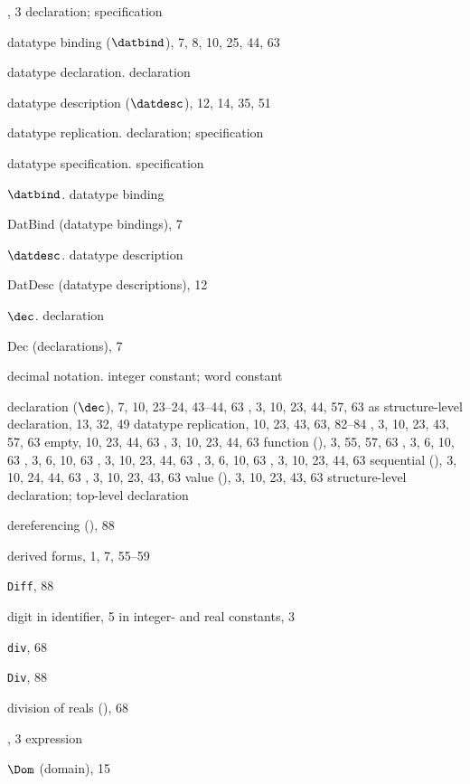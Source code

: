 \begin{theindex}
\item \DATATYPE, 3
\subitem \seealso declaration; specification
\item datatype binding ($\datbind$), 7, 8, 10, 25, 44, 63
\item datatype declaration. \see declaration
\item datatype description ($\datdesc$), 12, 14, 35, 51
\item datatype replication. \see declaration; specification
\item datatype specification. \see specification
\item $\datbind$. \see datatype binding
\item DatBind (datatype bindings), 7
\item $\datdesc$. \see datatype description
\item DatDesc (datatype descriptions), 12
\item $\dec$. \see declaration
\item Dec (declarations), 7
\item decimal notation. \see integer constant; word constant
\item declaration ($\dec$), 7, 10, 23--24, 43--44, 63
\subitem {}, 3, 10, 23, 44, 57, 63
\subitem as structure-level declaration, 13, 32, 49
\subitem datatype replication, 10, 23, 43, 63, 82--84
\subitem {}, 3, 10, 23, 43, 57, 63
\subitem empty, 10, 23, 44, 63
\subitem {}, 3, 10, 23, 44, 63
\subitem function (), 3, 55, 57, 63
\subitem {}, 3, 6, 10, 63
\subitem {}, 3, 6, 10, 63
\subitem {}, 3, 10, 23, 44, 63
\subitem {}, 3, 6, 10, 63
\subitem {}, 3, 10, 23, 44, 63
\subitem sequential (\boxml{;}), 3, 10, 24, 44, 63
\subitem {}, 3, 10, 23, 43, 63
\subitem value (), 3, 10, 23, 43, 63
\subitem \seealso structure-level declaration; top-level declaration
\item dereferencing (\ml{!}), 88
\item derived forms, 1, 7, 55--59
\item {\tt Diff}, 88
\item digit
\subitem in identifier, 5
\subitem in integer- and real constants, 3
\item {\tt div}, 68
\item {\tt Div}, 88
\item division of reals (\ml{/}), 68
\item \DO, 3
\subitem \seealso expression
\item $\Dom$ (domain), 15

\end{theindex}

